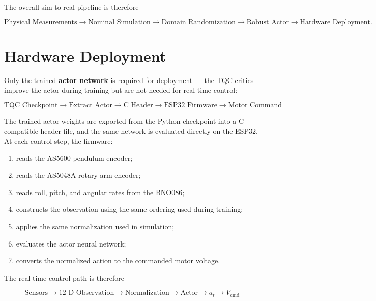 \documentclass[9pt]{extarticle}
\begin{document}
The overall sim-to-real pipeline is therefore

\begin{equation}
\boxed{
\text{Physical Measurements}
\rightarrow
\text{Nominal Simulation}
\rightarrow
\text{Domain Randomization}
\rightarrow
\text{Robust Actor}
\rightarrow
\text{Hardware Deployment}.
}
\end{equation}

\section{Hardware Deployment}

Only the trained \textbf{actor network} is required for deployment — the
TQC critics improve the actor during training but are not needed for
real-time control:

\begin{equation}
\boxed{
\text{TQC Checkpoint}
\rightarrow
\text{Extract Actor}
\rightarrow
\text{C Header}
\rightarrow
\text{ESP32 Firmware}
\rightarrow
\text{Motor Command}
}
\end{equation}

The trained actor weights are exported from the Python checkpoint into a
C-compatible header file, and the same network is evaluated directly on
the ESP32. At each control step, the firmware:

\begin{enumerate}
    \item reads the AS5600 pendulum encoder;
    \item reads the AS5048A rotary-arm encoder;
    \item reads roll, pitch, and angular rates from the BNO086;
    \item constructs the observation using the same ordering used during
    training;
    \item applies the same normalization used in simulation;
    \item evaluates the actor neural network;
    \item converts the normalized action to the commanded motor voltage.
\end{enumerate}

The real-time control path is therefore

\begin{equation}
\boxed{
\text{Sensors}
\rightarrow
\text{12-D Observation}
\rightarrow
\text{Normalization}
\rightarrow
\text{Actor}
\rightarrow
a_t
\rightarrow
V_{\mathrm{cmd}}
}
\end{equation}
\end{document}
